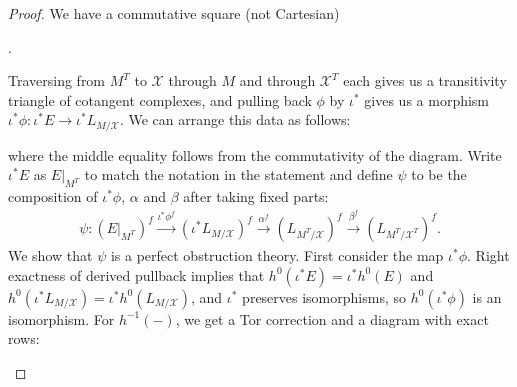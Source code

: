 \documentclass[12pt,dvipsnames]{amsart}
\begin{document}
\begin{proof}
  We have a commutative square (not Cartesian)
  \begin{center}
    .
  \end{center}
  Traversing from \(M^T\) to \(\mathcal X\) through \(M\) and through \(\mathcal X^T\) each gives us a transitivity triangle of cotangent complexes, and pulling back \(\phi\) by \(\iota^*\) gives us a morphism \(\iota^*\phi:\iota^*E\to \iota^*L_{M/\mathcal X}\). We can arrange this data as follows:
  \begin{center}
  \end{center}
  where the middle equality follows from the commutativity of the diagram. Write \(\iota^*E\) as \(E|_{M^T}\) to match the notation in the statement and define \(\psi\) to be the composition of \(\iota^*\phi\), \(\alpha\) and \(\beta\) after taking fixed parts:
  \begin{align*}
    \psi: \left(E|_{M^T}\right)^f\xrightarrow{\iota^*\phi^f} \left(\iota^*L_{M/\mathcal X}\right)^f \xrightarrow{\alpha^f} \left(L_{M^T/\mathcal X}\right)^f \xrightarrow{\beta^f} \left(L_{M^T/\mathcal X^T}\right)^f.
  \end{align*}
  We show that \(\psi\) is a perfect obstruction theory. First consider the map \(\iota^*\phi\). Right exactness of derived pullback implies that \(h^0(\iota^*E) = \iota^*h^0(E)\) and \(h^0(\iota^*L_{M/\mathcal X}) = \iota^*h^0(L_{M/\mathcal X})\), and \(\iota^*\) preserves isomorphisms, so \(h^0(\iota^*\phi)\) is an isomorphism. For \(h^{-1}(-)\), we get a Tor correction and a diagram with exact rows:
  \begin{center}
\end{center}
\end{proof}
\end{document}

